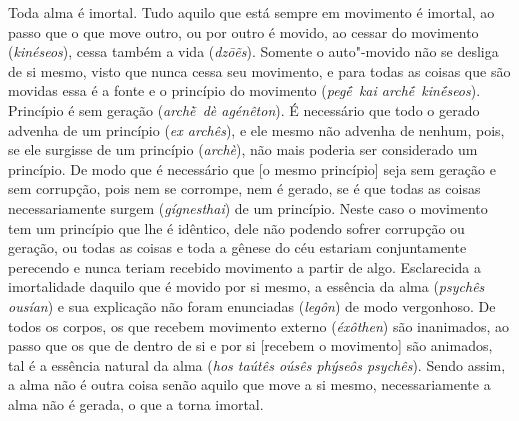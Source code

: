 Toda alma é imortal. Tudo aquilo que está sempre em movimento é imortal,
ao passo que o que move outro, ou por outro é movido, ao cessar do
movimento (\emph{kinéseos}), cessa também a vida (\emph{dzōẽs}). Somente
o auto"-movido não se desliga de si mesmo, visto que nunca cessa seu
movimento, e para todas as coisas que são movidas essa é a fonte e o
princípio do movimento (\emph{pegḗ~kai archḗ~kinḗseos}). Princípio é sem
geração (\emph{archḕ~dè agénêton}). \bekker{[245d]} É necessário que todo o
gerado advenha de um princípio (\emph{ex archês}), e ele mesmo não
advenha de nenhum, pois, se ele surgisse de um princípio
(\emph{archè}), não mais poderia ser considerado um princípio. De modo
que é necessário que [o mesmo princípio] seja sem geração e sem
corrupção, pois nem se corrompe, nem é gerado, se é que todas as coisas
necessariamente surgem (\emph{gígnesthai}) de um princípio. Neste caso o
movimento tem um princípio que lhe é idêntico, dele não podendo sofrer
corrupção ou geração, ou todas as coisas e toda a gênese do céu estariam
conjuntamente perecendo e nunca teriam recebido movimento a partir de
algo. \bekker{[245e]} Esclarecida a imortalidade daquilo que é movido por si
mesmo, a essência da alma (\emph{psychês ousían}) e sua explicação não
foram enunciadas (\emph{legôn}) de modo vergonhoso. De todos os corpos,
os que recebem movimento externo (\emph{éxôthen}) são inanimados, ao
passo que os que de dentro de si e por si [recebem o movimento] são
animados, tal é a essência natural da alma (\emph{hos taútês oúsês
phýseôs psychês}). Sendo assim, a alma não é outra coisa senão aquilo
que move a si mesmo, necessariamente a alma não é gerada, o que a torna
imortal.

